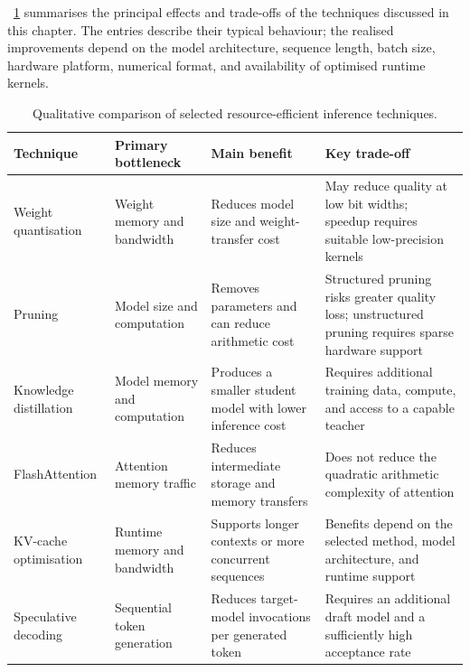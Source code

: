 ~\ref{tab:technique-comparison} summarises the principal effects and 
trade-offs of the techniques discussed in this chapter. The entries describe 
their typical behaviour; the realised improvements depend on the model 
architecture, sequence length, batch size, hardware platform, numerical format, 
and availability of optimised runtime kernels.

\begin{table}[htbp]
    \renewcommand{\arraystretch}{1.2}

    \begin{tabularx}{\textwidth}{
        >{\raggedright\arraybackslash}p{2.5cm}
        >{\raggedright\arraybackslash}p{2.7cm}
        >{\raggedright\arraybackslash}p{3.3cm}
        >{\raggedright\arraybackslash}X
    }
        \toprule
        \textbf{Technique} &
        \textbf{Primary bottleneck} &
        \textbf{Main benefit} &
        \textbf{Key trade-off} \\
        \midrule

        Weight quantisation &
        Weight memory and bandwidth &
        Reduces model size and weight-transfer cost &
        May reduce quality at low bit widths; speedup requires suitable low-precision kernels \\

        Pruning &
        Model size and computation &
        Removes parameters and can reduce arithmetic cost &
        Structured pruning risks greater quality loss; unstructured pruning requires sparse hardware support \\

        Knowledge distillation &
        Model memory and computation &
        Produces a smaller student model with lower inference cost &
        Requires additional training data, compute, and access to a capable teacher \\

        FlashAttention &
        Attention memory traffic &
        Reduces intermediate storage and memory transfers &
        Does not reduce the quadratic arithmetic complexity of attention \\

        KV-cache optimisation &
        Runtime memory and bandwidth &
        Supports longer contexts or more concurrent sequences &
        Benefits depend on the selected method, model architecture, and runtime support \\

        Speculative decoding &
        Sequential token generation &
        Reduces target-model invocations per generated token &
        Requires an additional draft model and a sufficiently high acceptance rate \\

        \bottomrule
    \end{tabularx}
        \centering
    \caption{Qualitative comparison of selected resource-efficient inference techniques.}
    \label{tab:technique-comparison}
    \small
\end{table}

